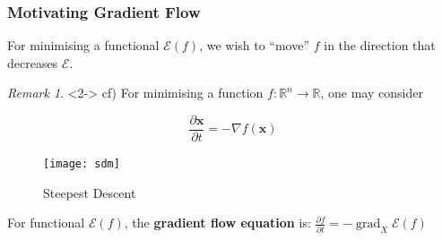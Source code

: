 \documentclass{beamer}
\theoremstyle{remark}
\newtheorem{remark}{Remark}
\newcommand{\xbf}{\mathbf{x}}
\newcommand{\ybf}{\mathbf{y}}
\newcommand{\inner}[1]{\langle \langle #1 \rangle \rangle}
\DeclareMathOperator{\grad}{grad}
\begin{document}
\begin{frame}
    \frametitle{Motivating Gradient Flow}
    For minimising a functional $\mathcal{E}(f)$, we wish to ``move'' $f$ in the direction that decreases $\mathcal{E}$.
    \begin{remark}<2->
    cf) For minimising a function $f:\mathbb{R}^n \rightarrow \mathbb{R}$, one may consider
    \begin{multicols}{2}
        \begin{equation*}
            \frac{\partial \xbf}{\partial t} = - \nabla f \left( \xbf \right)
        \end{equation*}
        \columnbreak
        \begin{figure}[h]
            \centering
            \texttt{[image: sdm]}
            \caption{Steepest Descent \cite{doi:10.1137/1.9781611974997.ch8}}
        \end{figure}
    \end{multicols}
    \end{remark}
    {
        \begin{definition}
            For functional $\mathcal{E} (f)$, the \textbf{gradient flow equation} is:
            $\frac{\partial f}{\partial t} = - \grad_X \mathcal{E} \left( f \right)$
        \end{definition}
    }
\end{frame}

%
%
%
%
\end{document}

